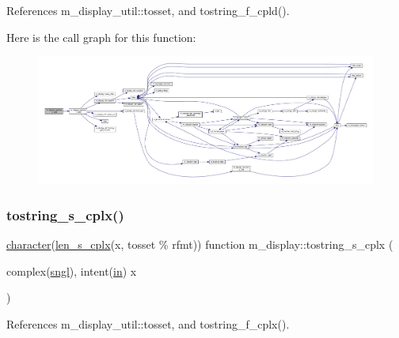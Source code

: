 References m\+\_\+display\+\_\+util\+::tosset, and tostring\+\_\+f\+\_\+cpld().

Here is the call graph for this function\+:
\nopagebreak
\begin{figure}[H]
\begin{center}
\leavevmode
\includegraphics[width=350pt]{namespacem__display_ac2a60653468bfb9215fb85b4518363e9_cgraph}
\end{center}
\end{figure}
\mbox{\label{namespacem__display_ab2141edcb1746f1aa92e31ed07d597a8}} 
\subsubsection{\texorpdfstring{tostring\+\_\+s\+\_\+cplx()}{tostring\_s\_cplx()}}
{\footnotesize\ttfamily \hyperlink{option__stopwatch_83_8txt_abd4b21fbbd175834027b5224bfe97e66}{character}(\hyperlink{namespacem__display_a7b573fb0cba7c7c954a820cdfe1c7968}{len\+\_\+s\+\_\+cplx}(x, tosset \% rfmt)) function m\+\_\+display\+::tostring\+\_\+s\+\_\+cplx (\begin{DoxyParamCaption}\item[{complex(\hyperlink{namespacem__display_a2ac86bc535c3ccc5947dbb3109c666b5}{sngl}), intent(\hyperlink{M__journal_83_8txt_afce72651d1eed785a2132bee863b2f38}{in})}]{x }\end{DoxyParamCaption})\hspace{0.3cm}{\ttfamily [private]}}



References m\+\_\+display\+\_\+util\+::tosset, and tostring\+\_\+f\+\_\+cplx().

